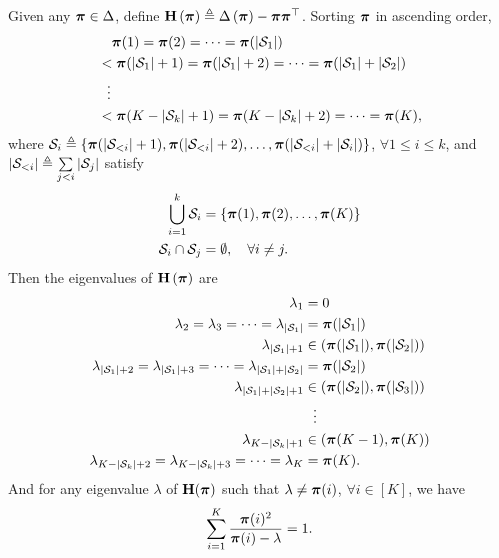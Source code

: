 \documentclass[10pt]{article}
\begin{document}
\begin{lem}
Given any ${\boldsymbol{\pi}} \in \Delta$, define ${\mathbf{H}}\left( {\boldsymbol{\pi}} \right) \triangleq \Delta \left( {\boldsymbol{\pi}} \right) - {\boldsymbol{\pi}} {\boldsymbol{\pi}}^\top$. Sorting ${\boldsymbol{\pi}}$ in ascending order,
\begin{equation*}
\begin{split}
    &\quad {\boldsymbol{\pi}}(1) = {\boldsymbol{\pi}}(2) = \cdots = {\boldsymbol{\pi}}(|{\mathcal{S}}_1|) \\
    &< {\boldsymbol{\pi}}(|{\mathcal{S}}_1|+1) = {\boldsymbol{\pi}}(|{\mathcal{S}}_1|+2) = \cdots = {\boldsymbol{\pi}}(|{\mathcal{S}}_1| + |{\mathcal{S}}_2|) \\
    &\ \ \vdots \\
    &< {\boldsymbol{\pi}}(K - |{\mathcal{S}}_k| + 1) = {\boldsymbol{\pi}}(K - |{\mathcal{S}}_k| + 2) = \cdots = {\boldsymbol{\pi}}(K),
\end{split}
\end{equation*}
where ${\mathcal{S}}_i \triangleq \left\{ {\boldsymbol{\pi}}(|{\mathcal{S}}_{<i}| + 1), {\boldsymbol{\pi}}(|{\mathcal{S}}_{<i}| + 2), \dots,  {\boldsymbol{\pi}}(|{\mathcal{S}}_{<i}| + |{\mathcal{S}}_i|) \right\}$, $\forall 1 \le i \le k$, and $|{\mathcal{S}}_{<i}| \triangleq \sum\limits_{j < i}{|{\mathcal{S}}_j|}$ satisfy \begin{equation*}
\begin{split}
    \bigcup_{i=1}^{k}{{\mathcal{S}}_i} &= \left\{ {\boldsymbol{\pi}}(1), {\boldsymbol{\pi}}(2), \dots, {\boldsymbol{\pi}}(K) \right\} \\
    {\mathcal{S}}_i \cap {\mathcal{S}}_j &= \emptyset, \quad \forall i \not= j.
\end{split}    
\end{equation*}
Then the eigenvalues of ${\mathbf{H}}\left( {\boldsymbol{\pi}} \right)$ are
\begin{equation*}
\begin{split}
    \lambda_{1} &= 0 \\
    \lambda_{2} = \lambda_{3} = \cdots = \lambda_{|{\mathcal{S}}_1|} &= {\boldsymbol{\pi}}(|{\mathcal{S}}_1|) \\
    \lambda_{|{\mathcal{S}}_1| + 1 } &\in \left( {\boldsymbol{\pi}}(|{\mathcal{S}}_1|), {\boldsymbol{\pi}}(|{\mathcal{S}}_2|) \right) \\
    \lambda_{|{\mathcal{S}}_1| + 2} = \lambda_{|{\mathcal{S}}_1| + 3} = \cdots = \lambda_{|{\mathcal{S}}_1| + |{\mathcal{S}}_2|} &= {\boldsymbol{\pi}}(|{\mathcal{S}}_2|) \\
    \lambda_{|{\mathcal{S}}_1| + |{\mathcal{S}}_2| + 1 } &\in \left( {\boldsymbol{\pi}}(|{\mathcal{S}}_2|), {\boldsymbol{\pi}}(|{\mathcal{S}}_3|) \right) \\
    &\ \ \vdots \\
    \lambda_{K - |{\mathcal{S}}_k| +1} &\in \left( {\boldsymbol{\pi}}(K-1), {\boldsymbol{\pi}}(K) \right) \\
    \lambda_{K - |{\mathcal{S}}_k| + 2} = \lambda_{K - |{\mathcal{S}}_k| + 3} = \cdots = \lambda_{K} &= {\boldsymbol{\pi}}(K).
\end{split}
\end{equation*}
And for any eigenvalue $\lambda$ of ${\mathbf{H}}({\boldsymbol{\pi}})$ such that $\lambda \not= {\boldsymbol{\pi}}(i)$, $\forall i \in [K]$, we have
\begin{equation*}
    \sum\limits_{i=1}^{K}{\frac{{\boldsymbol{\pi}}(i)^2}{{\boldsymbol{\pi}}(i) - \lambda}} = 1.
\end{equation*}
\end{lem}
\end{document}
